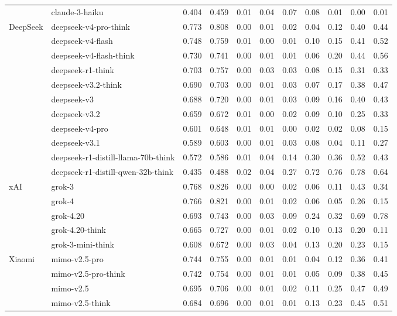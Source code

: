 \begin{longtable}{@{}ll rr rrrrrrr@{}}
 & claude-3-haiku & 0.404 & 0.459 & 0.01 & 0.04 & 0.07 & 0.08 & 0.01 & 0.00 & 0.01 \\
DeepSeek & deepseek-v4-pro-think & 0.773 & 0.808 & 0.00 & 0.01 & 0.02 & 0.04 & 0.12 & 0.40 & 0.44 \\
 & deepseek-v4-flash & 0.748 & 0.759 & 0.01 & 0.00 & 0.01 & 0.10 & 0.15 & 0.41 & 0.52 \\
 & deepseek-v4-flash-think & 0.730 & 0.741 & 0.00 & 0.01 & 0.01 & 0.06 & 0.20 & 0.44 & 0.56 \\
 & deepseek-r1-think & 0.703 & 0.757 & 0.00 & 0.03 & 0.03 & 0.08 & 0.15 & 0.31 & 0.33 \\
 & deepseek-v3.2-think & 0.690 & 0.703 & 0.00 & 0.01 & 0.03 & 0.07 & 0.17 & 0.38 & 0.47 \\
 & deepseek-v3 & 0.688 & 0.720 & 0.00 & 0.01 & 0.03 & 0.09 & 0.16 & 0.40 & 0.43 \\
 & deepseek-v3.2 & 0.659 & 0.672 & 0.01 & 0.00 & 0.02 & 0.09 & 0.10 & 0.25 & 0.33 \\
 & deepseek-v4-pro & 0.601 & 0.648 & 0.01 & 0.01 & 0.00 & 0.02 & 0.02 & 0.08 & 0.15 \\
 & deepseek-v3.1 & 0.589 & 0.603 & 0.00 & 0.01 & 0.03 & 0.08 & 0.04 & 0.11 & 0.27 \\
 & deepseek-r1-distill-llama-70b-think & 0.572 & 0.586 & 0.01 & 0.04 & 0.14 & 0.30 & 0.36 & 0.52 & 0.43 \\
 & deepseek-r1-distill-qwen-32b-think & 0.435 & 0.488 & 0.02 & 0.04 & 0.27 & 0.72 & 0.76 & 0.78 & 0.64 \\
xAI & grok-3 & 0.768 & 0.826 & 0.00 & 0.00 & 0.02 & 0.06 & 0.11 & 0.43 & 0.34 \\
 & grok-4 & 0.766 & 0.821 & 0.00 & 0.01 & 0.02 & 0.06 & 0.05 & 0.26 & 0.15 \\
 & grok-4.20 & 0.693 & 0.743 & 0.00 & 0.03 & 0.09 & 0.24 & 0.32 & 0.69 & 0.78 \\
 & grok-4.20-think & 0.665 & 0.727 & 0.00 & 0.01 & 0.02 & 0.10 & 0.13 & 0.20 & 0.11 \\
 & grok-3-mini-think & 0.608 & 0.672 & 0.00 & 0.03 & 0.04 & 0.13 & 0.20 & 0.23 & 0.15 \\
Xiaomi & mimo-v2.5-pro & 0.744 & 0.755 & 0.00 & 0.01 & 0.01 & 0.04 & 0.12 & 0.36 & 0.41 \\
 & mimo-v2.5-pro-think & 0.742 & 0.754 & 0.00 & 0.01 & 0.01 & 0.05 & 0.09 & 0.38 & 0.45 \\
 & mimo-v2.5 & 0.695 & 0.706 & 0.00 & 0.01 & 0.02 & 0.11 & 0.25 & 0.47 & 0.49 \\
 & mimo-v2.5-think & 0.684 & 0.696 & 0.00 & 0.01 & 0.01 & 0.13 & 0.23 & 0.45 & 0.51 \\

\end{longtable}
